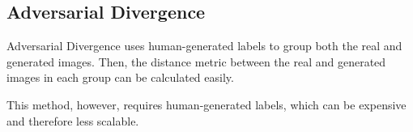 \subsection{Adversarial Divergence}
\label{sub:adversarial_divergence}

Adversarial Divergence uses human-generated labels to group both the real and generated images.
Then, the distance metric between the real and generated images in each group can be calculated easily. \cite{papernot2016distillation}

This method, however, requires human-generated labels, which can be expensive and therefore less scalable. 